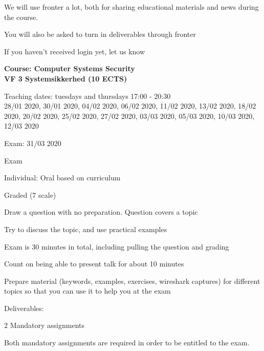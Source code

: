 \documentclass[Screen16to9,17pt]{foils}
\begin{document}


We will use fronter a lot, both for sharing educational materials and news during the course.

You will also be asked to turn in deliverables through fronter


\vskip 5mm
\centerline{If you haven't received login yet, let us know}





{\Large\bf Course: Computer Systems Security\\
VF 3 Systemsikkerhed (10 ECTS)}

Teaching dates: tuesdays and thursdays 17:00 - 20:30\\
28/01 2020, 30/01 2020, 04/02 2020, 06/02 2020, 11/02 2020, 13/02 2020, 18/02 2020, 20/02 2020, 25/02 2020, 27/02 2020, 03/03 2020, 05/03 2020, 10/03 2020, 12/03 2020

Exam: 31/03 2020


\begin{list2}
\item Exam
\item Individual: Oral based on curriculum
\item Graded (7 scale)
\item Draw a question with no preparation. Question covers a topic
\item Try to discuss the topic, and use practical examples
\item Exam is 30 minutes in total, including pulling the question and grading
\item Count on being able to present talk for about 10 minutes
\item Prepare material (keywords, examples, exercises, wireshark captures) for different topics so that you can use it to help you at the exam

\vskip 5mm
\item Deliverables:
\item 2 Mandatory assignments
\item Both mandatory assignments are required in order to be entitled to the exam.
\end{list2}
\end{document}
